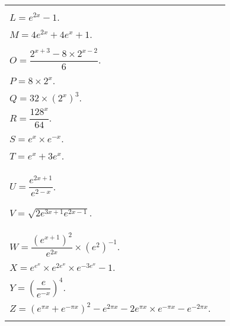 \begin{tabular}{ll}
\begin{minipage}{7.3cm}
\begin{itemize}
\item[•] $K = e^{2x} - e^x$. \vspace*{.3cm} \\
\item[•] $L = e^{2x} - 1$. \vspace*{.3cm} \\
\item[•] $M = 4e^{2x} + 4e^x + 1$. \vspace*{.3cm} \\
\end{itemize}
\end{minipage}
&
\begin{minipage}{8cm}
\begin{itemize}
\item[•] $N = xe^x - e^{3x}$. \vspace*{.3cm} \\
\item[•] $O = \dfrac{2^{x+3} - 8 \times 2^{x-2}}{6}$.\vspace*{.3cm} \\
\item[•] $P = 8 \times 2^x$. \vspace*{.3cm} \\
\item[•] $Q = 32 \times \left(2^x\right)^3$. \vspace*{.3cm} \\
\item[•] $R =  \dfrac{128^x}{64}$. \vspace*{.3cm} \\
\item[•] $S = e^x \times e^{-x}$. \vspace*{.3cm} \\
\item[•] $T = e^x + 3e^x$. \vspace*{.3cm} \\
\item[•] $U = \dfrac{e^{2x+1}}{e^{2-x}}$. \vspace*{.3cm}
\item[•] $V = \sqrt{2e^{3x+1}{e^{2x-1}}}$. \vspace*{.3cm} \\
\item[•] $W = \dfrac{\left(e^{x+1}\right)^2}{e^{2x}} \times \left(e^{2}\right)^{-1}$. \vspace*{.3cm} \\
\item[•] $X = e^{e^x} \times e^{2e^{x}} \times e^{-3e^{x}} - 1$. \vspace*{.3cm} \\
\item[•] $Y = \left(\dfrac{e}{e^{-x}}\right)^4$. \vspace*{.3cm} \\
\item[•] $Z = \left(e^{\pi x} + e^{-\pi x}\right)^2 - e^{2\pi x} - 2e^{\pi x}\times e^{-\pi x} - e^{-2\pi x}$. \vspace*{.3cm} \\
\end{itemize}
\end{minipage}
\end{tabular}

